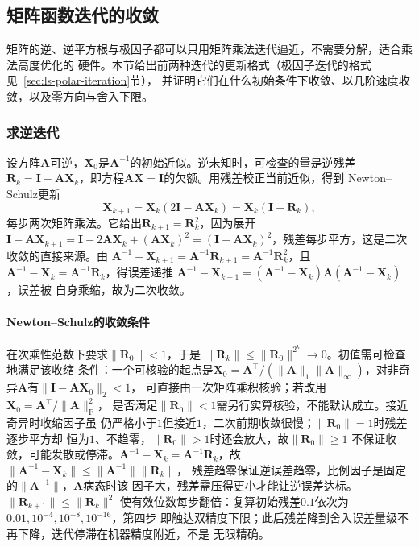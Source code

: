 \subsection{矩阵函数迭代的收敛}
\label{sec:ls-matrix-function-iteration-convergence}

矩阵的逆、逆平方根与极因子都可以只用矩阵乘法迭代逼近，不需要分解，适合乘法高度优化的
硬件。本节给出前两种迭代的更新格式（极因子迭代的格式见~\ref{sec:ls-polar-iteration}节），
并证明它们在什么初始条件下收敛、以几阶速度收敛，以及零方向与舍入下限。

\subsubsection{求逆迭代}

设方阵$\bm A$可逆，$\bm X_0$是$\bm A^{-1}$的初始近似。逆未知时，可检查的量是逆残差
$\bm R_k=\bm I-\bm A\bm X_k$，即方程$\bm A\bm X=\bm I$的欠额。用残差校正当前近似，得到
Newton--Schulz更新
\begin{equation}
 \bm X_{k+1}=\bm X_k(2\bm I-\bm A\bm X_k)=\bm X_k(\bm I+\bm R_k),
 \label{eq:ls-newton-schulz-inverse}
\end{equation}
每步两次矩阵乘法。它给出$\bm R_{k+1}=\bm R_k^2$，因为展开
$\bm I-\bm A\bm X_{k+1}=\bm I-2\bm A\bm X_k+(\bm A\bm X_k)^2
=(\bm I-\bm A\bm X_k)^2$，残差每步平方，这是二次收敛的直接来源。由
$\bm A^{-1}-\bm X_{k+1}=\bm A^{-1}\bm R_{k+1}=\bm A^{-1}\bm R_k^2$，且
$\bm A^{-1}-\bm X_k=\bm A^{-1}\bm R_k$，得误差递推
$\bm A^{-1}-\bm X_{k+1}=(\bm A^{-1}-\bm X_k)\bm A(\bm A^{-1}-\bm X_k)$，误差被
自身乘缩，故为二次收敛。

\paragraph{Newton--Schulz的收敛条件}

在次乘性范数下要求$\lVert\bm R_0\rVert<1$，于是
$\lVert\bm R_k\rVert\leq\lVert\bm R_0\rVert^{2^k}\to0$。初值需可检查地满足该收缩
条件：一个可核验的起点是$\bm X_0=\bm A^{\top}/(\lVert\bm A\rVert_1
\lVert\bm A\rVert_\infty)$，对非奇异$\bm A$有$\lVert\bm I-\bm A\bm X_0\rVert_2<1$，
可直接由一次矩阵乘积核验；若改用$\bm X_0=\bm A^{\top}/\lVert\bm A\rVert_{\mathrm F}^2$，
是否满足$\lVert\bm R_0\rVert<1$需另行实算核验，不能默认成立。接近奇异时收缩因子虽
仍严格小于$1$但接近$1$，二次前期收敛很慢；$\lVert\bm R_0\rVert=1$时残差逐步平方却
恒为$1$、不趋零，$\lVert\bm R_0\rVert>1$时还会放大，故$\lVert\bm R_0\rVert\geq1$
不保证收敛，可能发散或停滞。$\bm A^{-1}-\bm X_k=\bm A^{-1}\bm R_k$，故
$\lVert\bm A^{-1}-\bm X_k\rVert\leq\lVert\bm A^{-1}\rVert\lVert\bm R_k\rVert$，
残差趋零保证逆误差趋零，比例因子是固定的$\lVert\bm A^{-1}\rVert$，$\bm A$病态时该
因子大，残差需压得更小才能让逆误差达标。$\lVert\bm R_{k+1}\rVert\leq\lVert\bm R_k\rVert^2$
使有效位数每步翻倍：复算初始残差$0.1$依次为$0.01,10^{-4},10^{-8},10^{-16}$，第四步
即触达双精度下限；此后残差降到舍入误差量级不再下降，迭代停滞在机器精度附近，不是
无限精确。

